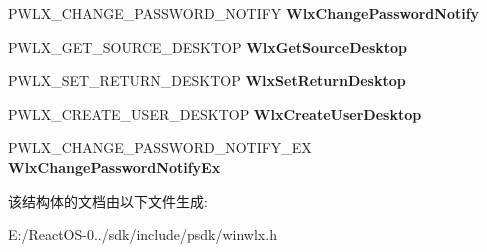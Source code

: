\begin{DoxyCompactItemize}
\mbox{\label{struct___w_l_x___d_i_s_p_a_t_c_h___v_e_r_s_i_o_n__1__1_a90b8f60189aa302e04407d1b0c7cb9df}} 
P\+W\+L\+X\+\_\+\+C\+H\+A\+N\+G\+E\+\_\+\+P\+A\+S\+S\+W\+O\+R\+D\+\_\+\+N\+O\+T\+I\+FY {\bfseries Wlx\+Change\+Password\+Notify}
\item 
\mbox{\label{struct___w_l_x___d_i_s_p_a_t_c_h___v_e_r_s_i_o_n__1__1_afbf5646ba5d53b36ceca0e900d3d9b9a}} 
P\+W\+L\+X\+\_\+\+G\+E\+T\+\_\+\+S\+O\+U\+R\+C\+E\+\_\+\+D\+E\+S\+K\+T\+OP {\bfseries Wlx\+Get\+Source\+Desktop}
\item 
\mbox{\label{struct___w_l_x___d_i_s_p_a_t_c_h___v_e_r_s_i_o_n__1__1_a7e8da1e825aec51ac5452237819c345f}} 
P\+W\+L\+X\+\_\+\+S\+E\+T\+\_\+\+R\+E\+T\+U\+R\+N\+\_\+\+D\+E\+S\+K\+T\+OP {\bfseries Wlx\+Set\+Return\+Desktop}
\item 
\mbox{\label{struct___w_l_x___d_i_s_p_a_t_c_h___v_e_r_s_i_o_n__1__1_aab0432a5303409a3d652582c2a701d92}} 
P\+W\+L\+X\+\_\+\+C\+R\+E\+A\+T\+E\+\_\+\+U\+S\+E\+R\+\_\+\+D\+E\+S\+K\+T\+OP {\bfseries Wlx\+Create\+User\+Desktop}
\item 
\mbox{\label{struct___w_l_x___d_i_s_p_a_t_c_h___v_e_r_s_i_o_n__1__1_a03bc0e0ee4c21b456d4c8acd2904a5b3}} 
P\+W\+L\+X\+\_\+\+C\+H\+A\+N\+G\+E\+\_\+\+P\+A\+S\+S\+W\+O\+R\+D\+\_\+\+N\+O\+T\+I\+F\+Y\+\_\+\+EX {\bfseries Wlx\+Change\+Password\+Notify\+Ex}
\end{DoxyCompactItemize}


该结构体的文档由以下文件生成\+:\begin{DoxyCompactItemize}
\item 
E\+:/\+React\+O\+S-\/0../sdk/include/psdk/winwlx.\+h\end{DoxyCompactItemize}
